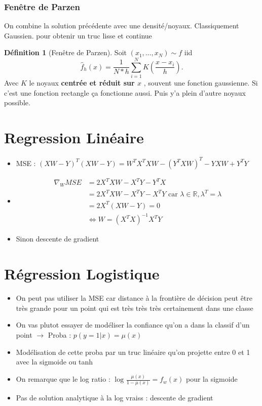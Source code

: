 \documentclass{article}
\theoremstyle{plain}%
\theoremstyle{definition}
\newtheorem{defn}{Définition}[section]
\theoremstyle{remark}
\begin{document}
\subsubsection{Fenêtre de Parzen}
On combine la solution précédente avec une densité/noyaux. Classiquement Gaussien. pour obtenir un truc lisse et continue
\begin{defn}[Fenêtre de Parzen]
    Soit $ (x_1, \dots, x_N) \sim f $ iid 
    \[
        \hat{f}_h(x) = \frac{1}{N*h} \sum_{i=1}^{N}K (\frac{x - x_i}{h})
    .\]
    Avec $ K $ le noyaux \textbf{centrée et réduit sur $ x $ }, souvent une fonction gaussienne. Si c'est une fonction rectangle ça fonctionne aussi. Puis y'a plein d'autre noyaux possible.
\end{defn}

\section{Regression Linéaire}
\begin{itemize}
    \item MSE : $ (XW - Y)^T (XW - Y) = W^T X^T X W - (Y^T X W)^T - YXW + Y^TY $ 
    \item \begin{align*}
        \nabla _W MSE &= 2X^TXW - X^T Y - Y^T X  \\
            &= 2X^TXW - X^T Y - X^TY  \text{ car } \lambda \in \mathbb{R}, \lambda ^T = \lambda \\
            &= 2X^T (XW - Y) = 0 \\
            &\Leftrightarrow W = (X^TX)^{-1} X^T Y
    \end{align*}
    \item Sinon descente de gradient
\end{itemize}

\section{Régression Logistique}
\begin{itemize}
    \item On peut pas utiliser la MSE car distance à la frontière de décision peut être très grande pour un point qui est très très très certainement dans une classe
    \item On vas plutot essayer de modéliser la confiance qu'on a dans la classif d'un point $\rightarrow$ Proba : $ p(y=1|x) = \mu (x) $ 
    \item Modélisation de cette proba par un truc linéaire qu'on projette entre 0 et 1 avec la sigmoide ou tanh  
    \item On remarque que le log ratio : $ \log_{} \frac{\mu (x)}{1 - \mu (x)} = f_w(x) $ pour la sigmoide 
    \item Pas de solution analytique à la log vraiss : descente de gradient
\end{itemize}
\end{document}
